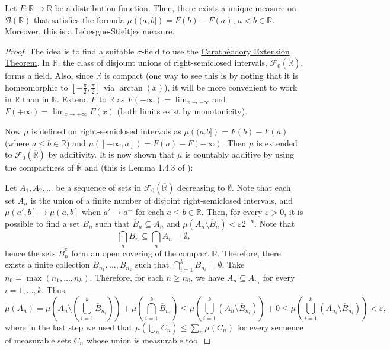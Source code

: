 \begin{thrm}\label{theorem:Lebesgue-Stieltjes}
		Let \(F\colon\mathbb{R}\to\mathbb{R}\) be a distribution function. Then, there exists a unique measure on \(\mathscr{B}\left(\mathbb{R}\right)\) that satisfies the formula \(\mu\left( (a,b]\right)=F(b)-F(a)\), \(a<b\in\mathbb{R}\). Moreover, this is a Lebesgue-Stieltjes measure.
\end{thrm}
\begin{proof}
The idea is to find a suitable \(\sigma\)-field to use the \hyperref[theorem:Caratheodory Extension]{Carathéodory Extension Theorem}. In \(\overline{\mathbb{R}}\), the class of disjount unions of right-semiclosed intervals, \(\mathcal{F}_0(\overline{\mathbb{R}})\), forms a field. Also, since \(\overline{\mathbb{R}}\) is compact (one way to see this is by noting that it is homeomorphic to \(\left[-\frac{\pi}{2},\frac{\pi}{2}\right]\) via \(\arctan(x)\)), it will be more convenient to work in \(\overline{\mathbb{R}}\) than in \(\mathbb{R}\). Extend \(F\) to \(\overline{\mathbb{R}}\) as \(F(-\infty)=\lim_{x\to-\infty}\)and \(F(+\infty)=\lim_{x\to+\infty}F(x)\) (both limits exist by monotonicity).

Now \(\mu\) is defined on right-semiclosed intervals as \(\mu\left( (a.b]\right)=F(b)-F(a)\) (where \(a\leq b\in\overline{\mathbb{R}}\)) and \(\mu([-\infty,a])=F(a)-F(-\infty)\). Then \(\mu\) is extended to \(\mathcal{F}_0(\overline{\mathbb{R}})\) by additivity. It is now shown that \(\mu\) is countably additive by using the compactness of \(\overline{\mathbb{R}}\) and  (this is Lemma 1.4.3 of \cite{ash1972real}):

Let \(A_1,A_2,\dots\) be a sequence of sets in \(\mathcal{F}_0(\overline{\mathbb{R}})\) decreasing to \(\emptyset\). Note that each set \(A_n\) is the union of a finite number of disjoint right-semiclosed intervals, and \(\mu\left(a',b\right]\to\mu\left(a,b\right]\) when \(a'\to a^+\) for each \(a\leq b\in\overline{\mathbb{R}}\). Then, for every \(\varepsilon>0\), it is possible to find a set \(B_n\) such that \(\overline{B}_n\subseteq A_n\) and \(\mu\left(A_n\setminus\overline{B}_n\right)<\varepsilon 2^{-n}
\). Note that
\[
		\bigcap_{n}\overline{B}_n\subseteq\bigcap_{n}A_n=\emptyset
,\]
hence the sets \(\overline{B}_n^c\) form an open covering of the compact \(\overline{\mathbb{R}}\). Therefore, there exists a finite collection \(\overline{B}_{n_{1}}, \dots , \overline{B}_{n_{k}}\) such that \(\bigcap_{i=1}^k\overline{B}_{n_i}=\emptyset\). Take \(n_0=\max(n_1,\dots,n_k)\). Therefore, for each \(n\geq n_0\), we have \(A_n\subseteq A_{n_i}\) for every \(i=1,\dots,k\). Thus,
\[
		\mu(A_n)=\mu\left(A_n\setminus\left(\bigcup_{i=1}^k\overline{B}_{n_i}\right)\right)+\mu\left(\bigcap_{i=1}^k\overline{B}_{n_i}\right)\leq\mu\left(\bigcup_{i=1}^k\left(A_n\setminus\overline{B}_{n_i}\right)\right)+0\leq\mu\left(\bigcup_{i=1}^k\left(A_{n_i}\setminus\overline{B}_{n_i}\right)\right)<\varepsilon
,\]
where in the last step we used that \(\mu\left(\bigcup_{n}C_n\right)\leq\sum_{n} \mu(C_n)\) for every sequence of measurable sets \(C_n\) whose union is measurable too. 


\end{proof}
